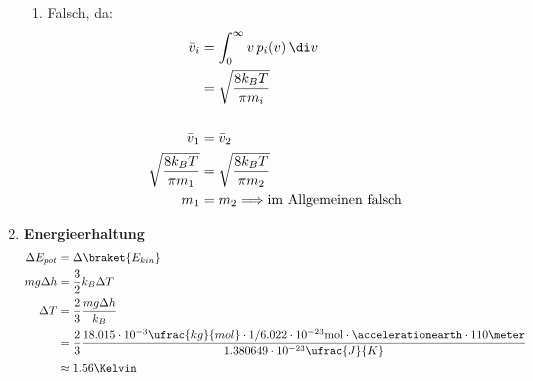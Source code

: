 \documentclass[11pt,letterpaper]{article}
\begin{document}
\begin{enumerate}
\begin{enumerate}
        \item Falsch, da:
            \begin{align*}
                \bar{v}_i &= \int_{0}^{\infty} v\,p_i(v)\,\di v\\
                &= \sqrt{\frac{8 k_B T}{\pi m_i}}\\
                \\
                \bar{v}_1 &= \bar{v}_2\\
                \sqrt{\frac{8 k_B T}{\pi m_1}} &= \sqrt{\frac{8 k_B T}{\pi m_2}}\\
                m_1 &= m_2 \Longrightarrow \text{im Allgemeinen falsch}\\
            \end{align*}
    \end{enumerate}

    \item \textbf{Energieerhaltung}
    \begin{align*}
        \Delta {E_{pot}} &= \Delta \braket{E_{kin}}\\
        mg\Delta h &= \frac{3}{2}k_B \Delta T\\
        \Delta T &= \frac{2}{3}\frac{mg\Delta h}{k_B}\\
         &= \frac{2}{3} \frac{18.015\cdot 10^{-3}\ufrac{kg}{mol}\cdot 1/6.022 \cdot  10^{-23}\mathrm{mol}\cdot \accelerationearth\cdot 110\meter}
         {1.380649\cdot 10^{-23} \ufrac{J}{K}}\\
         &\approx 1.56\Kelvin 
    \end{align*}
\end{enumerate}
\end{document}
